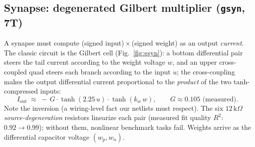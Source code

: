 \documentclass[11pt]{article}
\begin{document}
\subsection{Synapse: degenerated Gilbert multiplier (\texttt{gsyn}, 7T)}

A synapse must compute (signed input)\,$\times$\,(signed weight) as an output \emph{current}. The classic circuit is the Gilbert cell (Fig.~\ref{fig:gsyn}): a bottom differential pair steers the tail current according to the weight voltage $w$, and an upper cross-coupled quad steers each branch according to the input $u$; the cross-coupling makes the output differential current proportional to the \emph{product} of the two tanh-compressed inputs:
\[
I_{\text{out}} \;\approx\; -\,G \cdot \tanh(2.25\,u)\cdot \tanh(k_w\,w), \qquad G \approx 0.105 \text{ (measured)} .
\]
Note the inversion (a wiring-level fact our netlists must respect). The six $12\,\mathrm{k}\Omega$ \emph{source-degeneration} resistors linearize each pair (measured fit quality $R^2$: $0.92 \to 0.99$); without them, nonlinear benchmark tasks fail. Weights arrive as the differential capacitor voltage $(w_p, w_n)$.
\end{document}
